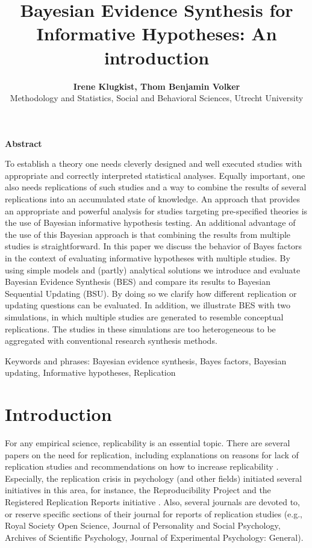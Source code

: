 \documentclass[11pt,reqno]{article}
\begin{document}
\titlepage
\title{\textbf{Bayesian Evidence Synthesis for Informative Hypotheses: An introduction}}
\author{\textbf{Irene Klugkist, Thom Benjamin Volker} \\
Methodology and Statistics, Social and Behavioral Sciences, Utrecht University} \maketitle



\noindent \textbf{Abstract}

\noindent To establish a theory one needs cleverly designed and well executed studies with appropriate and correctly interpreted statistical analyses. Equally important, one also needs replications of such studies and a way to combine the results of several replications into an accumulated state of knowledge. An approach that provides an appropriate and powerful analysis for studies targeting pre-specified theories is the use of Bayesian informative hypothesis testing. An additional advantage of the use of this Bayesian approach is that combining the results from multiple studies is straightforward. In this paper we discuss the behavior of Bayes factors in the context of evaluating informative hypotheses with multiple studies. By using simple models and (partly) analytical solutions we introduce and evaluate Bayesian Evidence Synthesis (BES) and compare its results to Bayesian Sequential Updating (BSU). By doing so we clarify how different replication or updating questions can be evaluated. In addition, we illustrate BES with two simulations, in which multiple studies are generated to resemble conceptual replications. The studies in these simulations are too heterogeneous to be aggregated with conventional research synthesis methods.


\bigskip

\noindent Keywords and phrases: Bayesian evidence synthesis, Bayes factors, Bayesian updating, Informative hypotheses, Replication


\newpage

\section{Introduction}
\label{intro}


For any empirical science, replicability is an essential topic. There are several papers on the need for replication, including explanations on reasons for lack of replication studies and recommendations on how to increase replicability \citep{asendorpf_replication_2013, simonsohn_telescopes_2015, verhagen_bayesian_2014, nosek_replicability_review_2021}.
Especially, the replication crisis in psychology (and other fields) initiated several initiatives in this area, for instance, the Reproducibility Project \citep{open_science_collab_2015, open_science_collab_2012} and the Registered Replication Reports initiative \citep{simons_registered_2014}. Also, several journals are devoted to, or reserve specific sections of their journal for reports of replication studies (e.g., Royal Society Open Science, Journal of Personality and Social Psychology, Archives of Scientific Psychology, Journal of Experimental Psychology: General).
\end{document}
